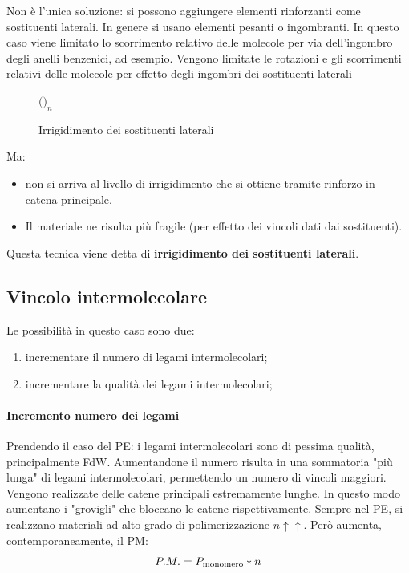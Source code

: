 Non è l'unica soluzione: si possono aggiungere elementi rinforzanti come sostituenti laterali. In genere si usano elementi pesanti o ingombranti.
In questo caso viene limitato lo scorrimento relativo delle molecole per via dell'ingombro degli anelli benzenici, ad esempio.
Vengono limitate le rotazioni e gli scorrimenti relativi delle molecole per effetto degli ingombri dei sostituenti laterali

\begin{figure}
\centering
$\Big($$\Big)_n$
\caption{Irrigidimento dei sostituenti laterali}
\label{fig:IrrigidimentoLaterali}
\end{figure}

Ma:
\begin{itemize}
\item non si arriva al livello di irrigidimento che si ottiene tramite rinforzo in catena principale.
\item Il materiale ne risulta più fragile (per effetto dei vincoli dati dai sostituenti).
\end{itemize}
Questa tecnica viene detta di \textbf{irrigidimento dei sostituenti laterali}.

\subsection{Vincolo intermolecolare}
Le possibilità in questo caso sono due:
\begin{enumerate}
\item incrementare il numero di legami intermolecolari;
\item incrementare la qualità dei legami intermolecolari;
\end{enumerate}

\paragraph{Incremento numero dei legami}
Prendendo il caso del \ac{PE}: i legami intermolecolari sono di pessima qualità, principalmente \ac{FdW}. Aumentandone il numero risulta in una sommatoria "più lunga" di legami intermolecolari, permettendo un numero di vincoli maggiori.
Vengono realizzate delle catene principali estremamente lunghe.
In questo modo aumentano i "grovigli" che bloccano le catene rispettivamente.
Sempre nel \ac{PE}, si realizzano materiali ad alto grado di polimerizzazione $n \uparrow\uparrow$.
Però aumenta, contemporaneamente, il \ac{PM}:
\begin{equation}
P.M. = P_{\textup{monomero}} * n
\end{equation}

